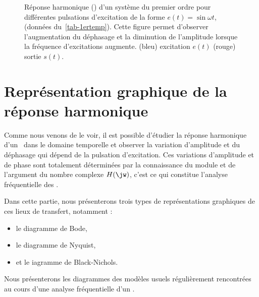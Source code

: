 \begin{figure}[!h]
\begin{center}
\caption{Réponse harmonique () d'un système du premier ordre
pour différentes pulsations d'excitation de la forme $e(t)=\sin{\omega t}$, (données du~\cref{tab-1ertemp}).
Cette figure permet d'observer l'augmentation du déphasage et la diminution 
de l'amplitude lorsque la fréquence d'excitations augmente. 
(bleu) excitation $e(t)$ (rouge) sortie $s(t)$.\label{fig-repham}}
\end{center}
\end{figure}



\newpage
\section{Représentation graphique de la réponse harmonique}

Comme nous venons de le voir, il est possible d'étudier
la réponse harmonique d'un \SLCI~dans le domaine 
temporelle et observer la variation d'amplitude et du 
déphasage qui dépend de la pulsation d'excitation. Ces variations 
d'amplitude et de phase sont totalement déterminées par la 
connaissance du module et de l'argument du nombre complexe $H(\jw)$, c'est ce qui constitue 
l'analyse fréquentielle des \SLCI.

Dans cette partie, nous présenterons trois types de représentations graphiques 
de ces lieux de transfert, notamment :
\begin{itemize}
    \item le diagramme de Bode,
    \item le diagramme de Nyquist,
    \item et le iagramme de Black-Nichols. 
\end{itemize}
Nous présenterons les diagrammes des modèles usuels régulièrement rencontrées 
au cours d'une analyse fréquentielle d'un \SLCI.

